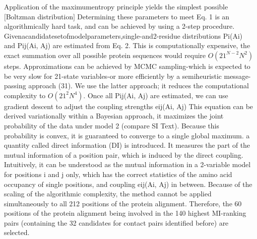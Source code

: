  Application of the maximumentropy principle yields the simplest possible [Boltzman distribution] \cite{weigt2009identification}
Determining these parameters to meet Eq. 1 is an algorithmically hard task, and can be achieved by using a 2-step procedure. \cite{weigt2009identification}
	Givenacandidatesetofmodelparameters,single-and2-residue distributions Pi(Ai) and Pij(Ai, Aj) are estimated from Eq. 2. This is computationally expensive, the exact summation over all possible protein sequences would require $O(21^{N-2} N^2)$ steps. Approximations can be achieved by MCMC sampling-which is expected to be very slow for 21-state variables-or more efficiently by a semiheuristic message-passing approach (31). We use the latter approach; it reduces the computational complexity to $O(21^2 N^4)$. \cite{weigt2009identification}
	Once all Pij(Ai, Aj) are estimated, we can use gradient descent to adjust the coupling strengths eij(Ai, Aj) \cite{weigt2009identification}
	This equation can be derived variationally within a Bayesian approach, it maximizes the joint probability of the data under model 2 (compare SI Text). Because this probability is convex, it is guaranteed to converge to a single global maximum. \cite{weigt2009identification}
	a quantity called direct information (DI) is introduced. It measures the part of the mutual information of a position pair, which is induced by the direct coupling. Intuitively, it can be understood as the mutual information in a 2-variable model for positions i and j only, which has the correct statistics of the amino acid occupancy of single positions, and coupling eij(Ai, Aj) in between.  \cite{weigt2009identification}
	Because of the scaling of the algorithmic complexity, the method cannot be applied simultaneously to all 212 positions of the protein alignment. Therefore, the 60 positions of the protein alignment being involved in the 140 highest MI-ranking pairs (containing the 32 candidates for contact pairs identified before) are selected. \cite{weigt2009identification}

